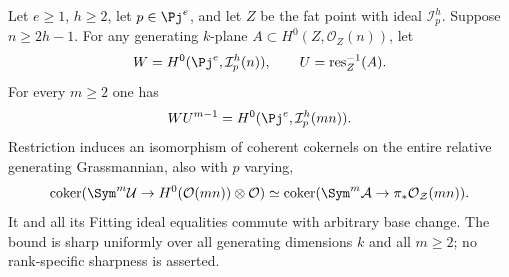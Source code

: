 \begin{theorem}\label{thm:fat-conductor}
Let $e\ge1$, $h\ge2$, let $p\in\Pj^e$, and let $Z$ be the fat point
with ideal $\mathcal I_p^h$. Suppose $n\ge2h-1$. For any generating
$k$-plane $A\subset H^0(Z,\mathcal O_Z(n))$, let
\[
 W=H^0(\Pj^e,\mathcal I_p^h(n)),\qquad
 U=\operatorname{res}_Z^{-1}(A).
\]
For every $m\ge2$ one has
\begin{equation}\label{eq:fat-saturation}
 WU^{m-1}=H^0(\Pj^e,\mathcal I_p^h(mn)).
\end{equation}
Restriction induces an isomorphism of coherent cokernels on the
entire relative generating Grassmannian, also with $p$ varying,
\begin{equation}\label{eq:fat-global-cokernel}
 \operatorname{coker}(\Sym^m\mathcal U\to H^0(\mathcal O(mn))\otimes\mathcal O)
 \simeq
 \operatorname{coker}(\Sym^m\mathcal A\to\pi_*\mathcal O_{\mathcal Z}(mn)).
\end{equation}
It and all its Fitting ideal equalities commute with arbitrary base
change. The bound is sharp uniformly over all generating dimensions
$k$ and all $m\ge2$; no rank-specific sharpness is asserted.
\end{theorem}
